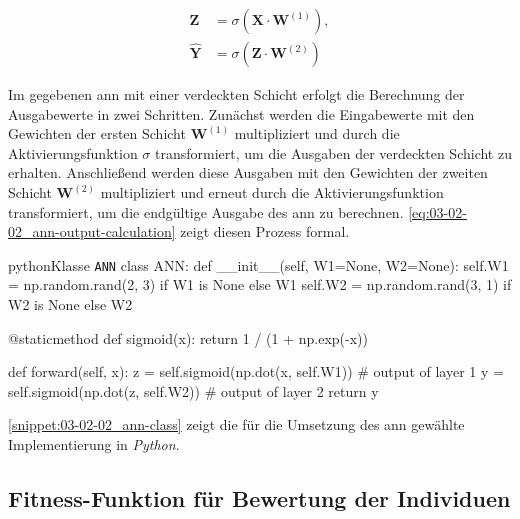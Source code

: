 \begin{equation}
    \begin{aligned}
        \mathbf{Z} &= \sigma\!\left(\mathbf{X} \cdot \mathbf{W}^{(1)}\right), \\
        \hat{\mathbf{Y}} &= \sigma\!\left(\mathbf{Z} \cdot \mathbf{W}^{(2)}\right)
    \end{aligned}
    \label{eq:03-02-02_ann-output-calculation}
\end{equation}

Im gegebenen \Gls{ann} mit einer verdeckten Schicht erfolgt die Berechnung der Ausgabewerte in zwei Schritten. Zunächst werden die Eingabewerte mit den Gewichten der ersten Schicht $\mathbf{W}^{(1)}$ multipliziert und durch die Aktivierungsfunktion $\sigma$ transformiert, um die Ausgaben der verdeckten Schicht zu erhalten. Anschließend werden diese Ausgaben mit den Gewichten der zweiten Schicht $\mathbf{W}^{(2)}$ multipliziert und erneut durch die Aktivierungsfunktion transformiert, um die endgültige Ausgabe des \Gls{ann} zu berechnen. \autoref{eq:03-02-02_ann-output-calculation} zeigt diesen Prozess formal.

\begin{snippet}[htb]
    \centering
    \begin{codebox}{python}{Klasse \texttt{ANN}}
        class ANN:
            def __init__(self, W1=None, W2=None):
                self.W1 = np.random.rand(2, 3) if W1 is None else W1
                self.W2 = np.random.rand(3, 1) if W2 is None else W2

            @staticmethod
            def sigmoid(x):
                return 1 / (1 + np.exp(-x))
            
            def forward(self, x):
                z = self.sigmoid(np.dot(x, self.W1))    # output of layer 1
                y = self.sigmoid(np.dot(z, self.W2))    # output of layer 2
                return y
    \end{codebox}
    \caption{Implementierung der Klasse \texttt{ANN}}
    \label{snippet:03-02-02_ann-class}
\end{snippet}

\autoref{snippet:03-02-02_ann-class} zeigt die für die Umsetzung des \Gls{ann} gewählte Implementierung in \textit{Python}.

\subsection{Fitness-Funktion für Bewertung der Individuen}
\label{sec:03-02-03_fitness-function-for-evaluation-of-individuals}

